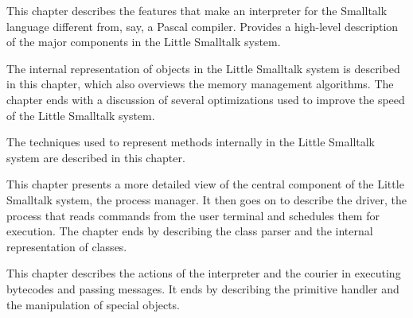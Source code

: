 \secdown

\secdown

This chapter describes the features that make an interpreter for the
Smalltalk language different from, say, a Pascal compiler. Provides a
high-level description of the major components in the Little Smalltalk
system.


\secup

\secdown

The internal representation of objects in the Little Smalltalk system is
described in this chapter, which also overviews the memory management algorithms. 
The chapter ends with a discussion of several optimizations used to 
improve the speed of the Little Smalltalk system.


\secup

\secdown

The techniques used to represent methods internally in the Little Smalltalk system are described in this chapter.


\secup

\secdown

This chapter presents a more detailed view of the central component
of the Little Smalltalk system, the process manager. It then goes on to
describe the driver, the process that reads commands from the user
terminal and schedules them for execution. The chapter ends by describing the class parser and the internal representation of classes.


\secup

\secdown

This chapter describes the actions of the interpreter and the courier
in executing bytecodes and passing messages. It ends by describing
the primitive handler and the manipulation of special objects.


\secup

\secup
